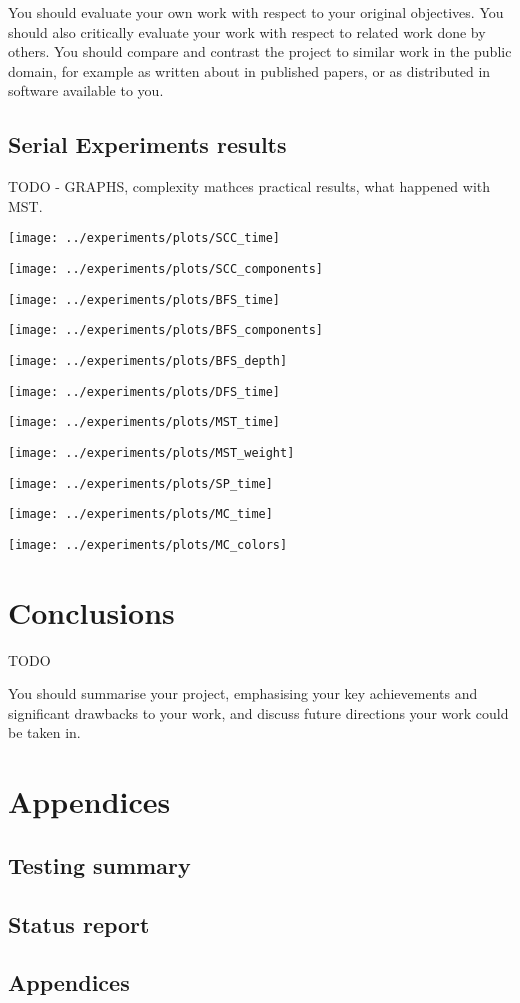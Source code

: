 \documentclass{report}
\theoremstyle{plain}
\theoremstyle{definition}
\theoremstyle{remark}
\begin{document}
You should evaluate your own work with respect to your original
objectives. You should also critically evaluate your work with respect to
related work done by others. You should compare and contrast the project
to similar work in the public domain, for example as written about in
published papers, or as distributed in software available to you.

\section{Serial Experiments results}

TODO - GRAPHS, complexity mathces practical results, what happened with MST.

\texttt{[image: ../experiments/plots/SCC\_time]}

\texttt{[image: ../experiments/plots/SCC\_components]}

\texttt{[image: ../experiments/plots/BFS\_time]}

\texttt{[image: ../experiments/plots/BFS\_components]}

\texttt{[image: ../experiments/plots/BFS\_depth]}

\texttt{[image: ../experiments/plots/DFS\_time]}

\texttt{[image: ../experiments/plots/MST\_time]}

\texttt{[image: ../experiments/plots/MST\_weight]}

\texttt{[image: ../experiments/plots/SP\_time]}

\texttt{[image: ../experiments/plots/MC\_time]}

\texttt{[image: ../experiments/plots/MC\_colors]}

\chapter{Conclusions}

TODO

You should summarise your project, emphasising your key achievements
and significant drawbacks to your work, and discuss future directions your
work could be taken in.

\chapter{Appendices}

\section{Testing summary}

\section{Status report}

\section{Appendices}



\end{document}
